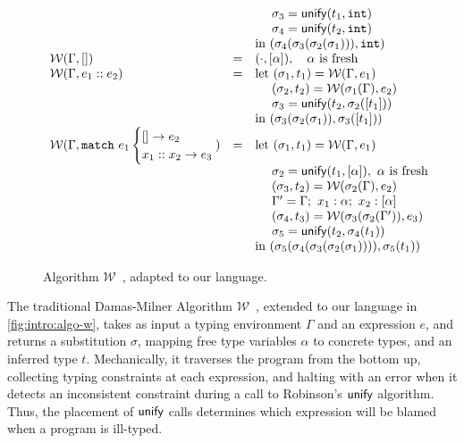 \begin{figure}
\[{\begin{array}{lcl}
   &   & \quad\ \sigma_3 = \unify{t_1}{\tint} \\
   &   & \quad\ \sigma_4 = \unify{t_2}{\tint} \\
   &   & \text{in } (\sigma_4(\sigma_3(\sigma_2(\sigma_1))), \tint) \\
\W(\Gamma, \enil)
   & = & (\cdot, \tlist{\alpha}), \quad \alpha \text{ is fresh} \\
\W(\Gamma, \econs{e_1}{e_2})
   & = & \text{let } (\sigma_1, t_1) = \W(\Gamma, e_1) \\
   &   & \quad\ (\sigma_2, t_2) = \W(\sigma_1(\Gamma), e_2) \\
   &   & \quad\ \sigma_3 = \unify{t_2}{\sigma_2(\tlist{t_1})} \\
   &   & \text{in } (\sigma_3(\sigma_2(\sigma_1)), \sigma_3(\tlist{t_1})) \\
\W(\Gamma, \elcase{e_1}{e_2}{x_1}{x_2}{e_3}\hspace{-2ex})
   & = & \text{let } (\sigma_1, t_1) = \W(\Gamma, e_1) \\
   &   & \quad\ \sigma_2 = \unify{t_1}{\tlist{\alpha}},\ \alpha \text{ is fresh} \\
   &   & \quad\ (\sigma_3, t_2) = \W(\sigma_2(\Gamma), e_2) \\
   &   & \quad\ \Gamma' = \Gamma;\ x_1:\alpha;\ x_2:\tlist{\alpha} \\
   &   & \quad\ (\sigma_4, t_3) = \W(\sigma_3(\sigma_2(\Gamma')), e_3) \\
   &   & \quad\ \sigma_5 = \unify{t_2}{\sigma_4(t_1)} \\
   &   & \text{in } (\sigma_5(\sigma_4(\sigma_3(\sigma_2(\sigma_1)))), \sigma_5(t_1)) \\
\end{array}
}
\]
\caption{Algorithm $\mathcal{W}$~\citep{Damas1982-uw}, adapted to our language. }
\label{fig:intro:algo-w}
\end{figure}

The traditional Damas-Milner Algorithm
$\mathcal{W}$~\citep{Damas1982-uw}, extended to our language in
\autoref{fig:intro:algo-w}, takes as input a typing environment $\Gamma$
and an expression $e$, and returns a substitution $\sigma$, mapping free
type variables $\alpha$ to concrete types, and an inferred type $t$.
%
Mechanically, it traverses the program from the bottom up, collecting
typing constraints at each expression, and halting with an error when it
detects an inconsistent constraint during a call to
Robinson's $\mathsf{unify}$ algorithm. 
%
Thus, the placement of $\mathsf{unify}$ calls determines which expression will be blamed when a program is ill-typed.

